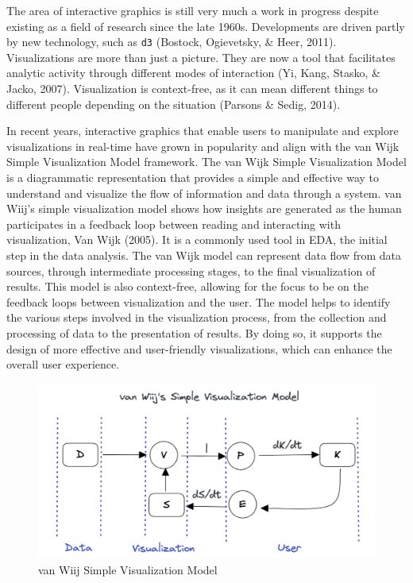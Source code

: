 \documentclass[print]{nuthesis}
\begin{document}
The area of interactive graphics is still very much a work in progress despite existing as a field of research since the late 1960s.
Developments are driven partly by new technology, such as \texttt{d3} (Bostock, Ogievetsky, \& Heer, 2011).
Visualizations are more than just a picture.
They are now a tool that facilitates analytic activity through different modes of interaction (Yi, Kang, Stasko, \& Jacko, 2007).
Visualization is context-free, as it can mean different things to different people depending on the situation (Parsons \& Sedig, 2014).

In recent years, interactive graphics that enable users to manipulate and explore visualizations in real-time have grown in popularity and align with the van Wijk Simple Visualization Model framework.
The van Wijk Simple Visualization Model is a diagrammatic representation that provides a simple and effective way to understand and visualize the flow of information and data through a system.
van Wiij's simple visualization model shows how insights are generated as the human participates in a feedback loop between reading and interacting with visualization, Van Wijk (2005).
It is a commonly used tool in EDA, the initial step in the data analysis.
The van Wijk model can represent data flow from data sources, through intermediate processing stages, to the final visualization of results.
This model is also context-free, allowing for the focus to be on the feedback loops between visualization and the user.
The model helps to identify the various steps involved in the visualization process, from the collection and processing of data to the presentation of results.
By doing so, it supports the design of more effective and user-friendly visualizations, which can enhance the overall user experience.

\begin{figure}

{\centering \includegraphics[width=0.45\linewidth]{figure/vanWiijSimpleModel} 

}

\caption{van Wiij Simple Visualization Model}\label{fig:vanWiijmodel}
\end{figure}
\end{document}
